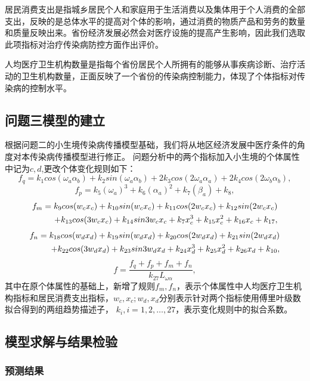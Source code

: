 \documentclass{whutmod}
\begin{document}
居民消费支出是指城乡居民个人和家庭用于生活消费以及集体用于个人消费的全部支出，反映的是总体水平的提高对个体的影响，通过消费的物质产品和劳务的数量和质量反映出来。省份经济发展必然会对医疗设施的提高产生影响，因此我们选取此项指标对治疗传染病防控方面作出评价。

人均医疗卫生机构数量是指每个省份居民个人所拥有的能够从事疾病诊断、治疗活动的卫生机构数量，正面反映了一个省份的传染病控制能力，体现了个体指标对传染病的控制水平。

\subsection{问题三模型的建立}
根据问题二的小生境传染病传播模型基础，我们将从地区经济发展中医疗条件的角度对本传染病传播模型进行修正。
问题分析中的两个指标加入小生境的个体属性中记为$c,d$,更改个体变化规则如下：
\begin{equation*}
    f_q=k_1cos(\omega_a\alpha_b)+k_2sin(\omega_a\alpha_b)+2k_3cos(2\omega_a\alpha_a)+2k_4cos(2\omega_b\alpha_b), 
\end{equation*}
\begin{equation*}
    f_p=k_5(\omega_a)^3+k_6(\alpha_a)^2+k_7(\beta_a)+k_8,
\end{equation*}
\begin{align}
    f_m=k_{9}cos(w_cx_c)+k_{10}sin(w_cx_c)+k_{11}cos(2w_cx_c)+k_{12}sin(2w_cx_c)\\
    \notag
    +k_{13}cos(3w_cx_c)+k_{14}sin{3w_cx_c}+k_7x_c^3+k_{15}x_c^2+k_{16}x_c+k_{17},
\end{align}
\begin{align}
    f_n=k_{18}cos(w_dx_d)+k_{19}sin(w_dx_d)+k_{20}cos(2w_dx_d)+k_{21}sin(2w_dx_d)\\
    \notag
    +k_{22}cos(3w_dx_d)+k_{23}sin{3w_dx_d}+k_{24}x_d^3+k_{25}x_d^2+k_{26}x_d+k_{10},
\end{align}
\begin{equation}
    f=\frac{f_q+f_p+f_m+f_n}{k_{27}L_{\omega\alpha}},
\end{equation}
其中在原个体属性的基础上，新增了规则$f_m,f_n$，表示个体属性中人均医疗卫生机构指标和居民消费支出指标，$w_c,x_c;w_d,x_d$分别表示针对两个指标使用傅里叶级数拟合得到的两组趋势描述子，
$k_i,i=1,2,\dots,27$，表示变化规则中的拟合系数。

\subsection{模型求解与结果检验}
\subsubsection{预测结果}
\end{document}
